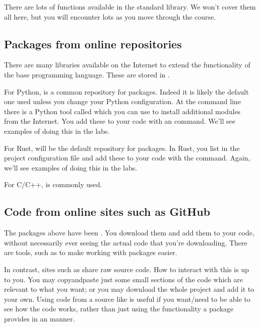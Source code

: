 \documentclass[letterpaper,10pt,british]{sphinxmanual}
\begin{document}
\sphinxAtStartPar
There are lots of functions available in the standard library. We won’t cover them all here, but you will encounter lots as you move through the course.


\subsection{Packages from online repositories}
\label{\detokenize{chapters/software_development_tools/libraries:packages-from-online-repositories}}
\sphinxAtStartPar
There are many libraries available on the Internet to extend the functionality of the base programming language. These are stored in .

\sphinxAtStartPar
For Python,  is a common repository for packages. Indeed it is likely the default one used unless you change your Python configuration. At the command line there is a Python tool called  which you can use to install additional modules from the Internet. You add these to your code with an  command. We’ll see examples of doing this in the labs.

\sphinxAtStartPar
For Rust,  will be the default repository for packages. In Rust, you list  in the  project configuration file and add these to your code with the  command. Again, we’ll see examples of doing this in the labs.

\sphinxAtStartPar
For C/C++,  is commonly used.


\subsection{Code from online sites such as GitHub}
\label{\detokenize{chapters/software_development_tools/libraries:code-from-online-sites-such-as-github}}
\sphinxAtStartPar
The packages above have been . You download them and add them to your code, without necessarily ever seeing the actual code that you’re downloading. There are tools, such as  to make working with packages easier.

\sphinxAtStartPar
In contrast, sites such as  share raw source code. How to interact with this is up to you. You may copy\sphinxhyphen{}and\sphinxhyphen{}paste just some small sections of the code which are relevant to what you want; or you may download the whole project and add it to your own. Using code from a source like  is useful if you want/need to be able to see how the code works, rather than just using the functionality a package provides in an  manner.
\end{document}
